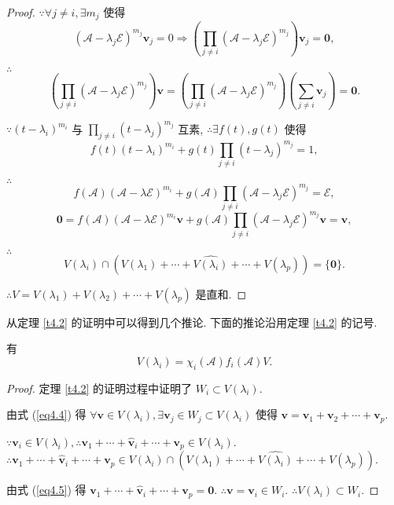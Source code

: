 \documentclass{ctexart}
\begin{document}
\begin{proof}
    $\because\forall j\neq i,\exists m_j$ 使得
    \[(\mathcal{A}-\lambda_j\mathcal{E})^{m_j}\boldsymbol{v}_j=0\Rightarrow\left(\prod\limits_{j\neq i}(\mathcal{A}-\lambda_j\mathcal{E})^{m_j}\right)\boldsymbol{v}_j=\boldsymbol{0},\]
    
    $\therefore$
    \[\left(\prod\limits_{j\neq i}(\mathcal{A}-\lambda_j\mathcal{E})^{m_j}\right)\boldsymbol{v}=\left(\prod\limits_{j\neq i}(\mathcal{A}-\lambda_j\mathcal{E})^{m_j}\right)\left(\sum\limits_{j\neq i}\boldsymbol{v}_j\right)=\boldsymbol{0}.\]

    $\because(t-\lambda_i)^{m_i}$ 与 $\prod\limits_{j\neq i}(t-\lambda_j)^{m_j}$ 互素, $\therefore\exists f(t),g(t)$ 使得
    \[f(t)(t-\lambda_i)^{m_i}+g(t)\prod\limits_{j\neq i}(t-\lambda_j)^{m_j}=1,\]

    $\therefore$
    \[f(\mathcal{A})(\mathcal{A}-\lambda\mathcal{E})^{m_i}+g(\mathcal{A})\prod\limits_{j\neq i}(\mathcal{A}-\lambda_j\mathcal{E})^{m_j}=\mathcal{E},\]
    \[\boldsymbol{0}=f(\mathcal{A})(\mathcal{A}-\lambda\mathcal{E})^{m_i}\boldsymbol{v}+g(\mathcal{A})\prod\limits_{j\neq i}(\mathcal{A}-\lambda_j\mathcal{E})^{m_j}\boldsymbol{v}=\boldsymbol{v},\]

    $\therefore$
    \begin{equation}\label{eq4.5}
        V(\lambda_i)\cap(V(\lambda_1)+\cdots+\widehat{V(\lambda_i)}+\cdots+V(\lambda_p))=\{\boldsymbol{0}\}.
    \end{equation}

    $\therefore V=V(\lambda_1)+V(\lambda_2)+\cdots+V(\lambda_p)$ 是直和.
\end{proof}
从定理 \ref{t4.2} 的证明中可以得到几个推论. 下面的推论沿用定理 \ref{t4.2} 的记号.
\begin{corollary}\label{c4.2}
    有
    \[V(\lambda_i)=\chi_i(\mathcal{A})f_i(\mathcal{A})V.\]
\end{corollary}
\begin{proof}
    定理 \ref{t4.2} 的证明过程中证明了 $W_i\subset V(\lambda_i)$.

    由式 (\ref{eq4.4}) 得 $\forall\boldsymbol{v}\in V(\lambda_i),\exists\boldsymbol{v}_j\in W_j\subset V(\lambda_i)$ 使得 $\boldsymbol{v}=\boldsymbol{v}_1+\boldsymbol{v}_2+\cdots+\boldsymbol{v}_p$.

    $\because\boldsymbol{v}_i\in V(\lambda_i),\therefore\boldsymbol{v}_1+\cdots+\hat{\boldsymbol{v}}_i+\cdots+\boldsymbol{v}_p\in V(\lambda_i)$. $\therefore\boldsymbol{v}_1+\cdots+\hat{\boldsymbol{v}}_i+\cdots+\boldsymbol{v}_p\in V(\lambda_i)\cap(V(\lambda_1)+\cdots+\widehat{V(\lambda_i)}+\cdots+V(\lambda_p))$.

    由式 (\ref{eq4.5}) 得 $\boldsymbol{v}_1+\cdots+\hat{\boldsymbol{v}}_i+\cdots+\boldsymbol{v}_p=\boldsymbol{0}$. $\therefore\boldsymbol{v}=\boldsymbol{v}_i\in W_i$. $\therefore V(\lambda_i)\subset W_i$.
\end{proof}
\end{document}
